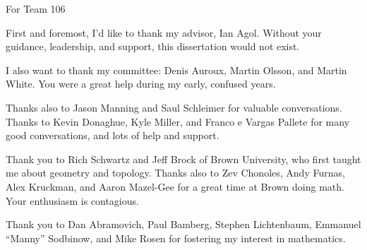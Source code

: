 \documentclass{ucbthesis}
\begin{document}
\begin{frontmatter}

\begin{dedication}
\null\vfil
\begin{center}



For Team 106\\\vspace{12pt}


\end{center} \vfil\null \end{dedication}


\tableofcontents
\clearpage
\listoffigures


\begin{acknowledgements}

First and foremost, I'd like to thank my advisor, Ian Agol. Without your
guidance, leadership, and support, this dissertation would not exist.



I also want to thank my committee: Denis Auroux, Martin Olsson, and Martin
White. You were a great help during my early, confused years.

Thanks also to Jason Manning and Saul Schleimer for valuable conversations.
Thanks to Kevin Donaghue, Kyle Miller, and Franco e Vargas Pallete for many
good conversations, and lots of help and support.

Thank you to Rich Schwartz and Jeff Brock of Brown University, who first taught
me about geometry and topology. Thanks also to Zev Chonoles, Andy Furnas, Alex
Kruckman, and Aaron Mazel-Gee for a great time at Brown doing math. Your
enthusiasm is contagious.

Thank you to Dan Abramovich, Paul Bamberg, Stephen Lichtenbaum, Emmanuel
``Manny'' Sodbinow, and Mike Rosen for fostering my interest in mathematics.


\end{acknowledgements}
\end{frontmatter}
\end{document}
